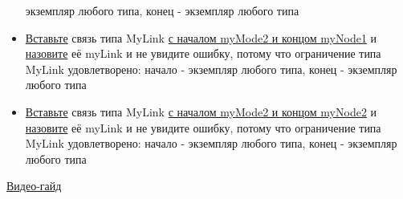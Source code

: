 \begin{itemize}
            экземпляр
            любого типа, конец - экземпляр любого типа
      \item \hyperlink{DeepCase.InsertLink.Description}{Вставьте} связь типа
            MyLink
            \hyperlink{FAQ.HowToInsertLinkWithFromAndTo}{с началом myMode2 и
                  концом
                  myNode1} и \hyperlink{FAQ.HowToSetName}{назовите} её myLink и
            не
            увидите
            ошибку, потому что ограничение типа MyLink удовлетворено: начало -
            экземпляр
            любого типа, конец - экземпляр любого типа
      \item \hyperlink{DeepCase.InsertLink.Description}{Вставьте} связь типа
            MyLink
            \hyperlink{FAQ.HowToInsertLinkWithFromAndTo}{с началом myMode2 и
                  концом
                  myNode2} и \hyperlink{FAQ.HowToSetName}{назовите} её myLink и
            не
            увидите
            ошибку, потому что ограничение типа MyLink удовлетворено: начало -
            экземпляр
            любого типа, конец - экземпляр любого типа
\end{itemize}
\href{https://youtu.be/PQObFIfhRMo}{Видео-гайд}
